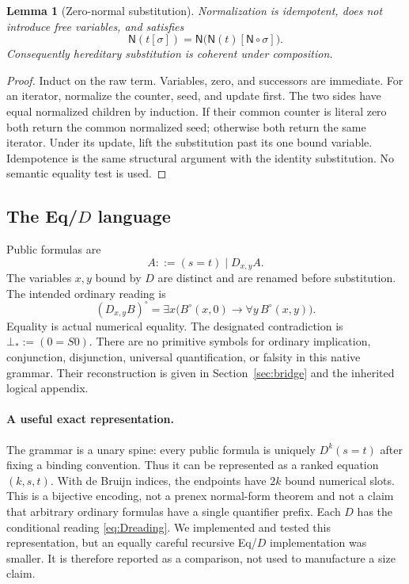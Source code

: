 \documentclass[11pt]{article}
\newtheorem{lemma}[theorem]{Lemma}
\theoremstyle{definition}
\newcommand{\nf}{\mathsf N}
\begin{document}
\begin{lemma}[Zero-normal substitution]
\label{lem:nf}
Normalization is idempotent, does not introduce free variables, and satisfies
\[
 \nf(t[\sigma])=\nf\bigl(\nf(t)[\nf\circ\sigma]\bigr).
\]
Consequently hereditary substitution is coherent under composition.
\end{lemma}
\begin{proof}
Induct on the raw term. Variables, zero, and successors are immediate.
For an iterator, normalize the counter, seed, and update first. The two
sides have equal normalized children by induction. If their common counter
is literal zero both return the common normalized seed; otherwise both
return the same iterator. Under its update, lift the substitution past its
one bound variable. Idempotence is the same structural argument with the
identity substitution. No semantic equality test is used.
\end{proof}

\subsection{The Eq/\texorpdfstring{$D$}{D} language}

Public formulas are
\[
 A ::= (s=t)\mid D_{x,y}A.
\]
The variables $x,y$ bound by $D$ are distinct and are renamed before
substitution. The intended ordinary reading is
\begin{equation}
 (D_{x,y}B)^\circ
   =\exists x\bigl(B^\circ(x,0)\to\forall y\,B^\circ(x,y)\bigr).
 \label{eq:Dreading}
\end{equation}
Equality is actual numerical equality. The designated contradiction is
$\bot_* := (0=S0)$. There are no primitive symbols for ordinary implication,
conjunction, disjunction, universal quantification, or falsity in this native
grammar. Their reconstruction is given in Section~\ref{sec:bridge} and the
inherited logical appendix.

\paragraph{A useful exact representation.}
The grammar is a unary spine: every public formula is uniquely
$D^k(s=t)$ after fixing a binding convention. Thus it can be represented
as a ranked equation $(k,s,t)$. With de Bruijn indices, the endpoints have
$2k$ bound numerical slots. This is a bijective encoding, not a prenex
normal-form theorem and not a claim that arbitrary ordinary formulas have
a single quantifier prefix. Each $D$ has the conditional reading
\eqref{eq:Dreading}. We implemented and tested this representation, but
an equally careful recursive Eq/$D$ implementation was smaller. It is
therefore reported as a comparison, not used to manufacture a size claim.
\end{document}
